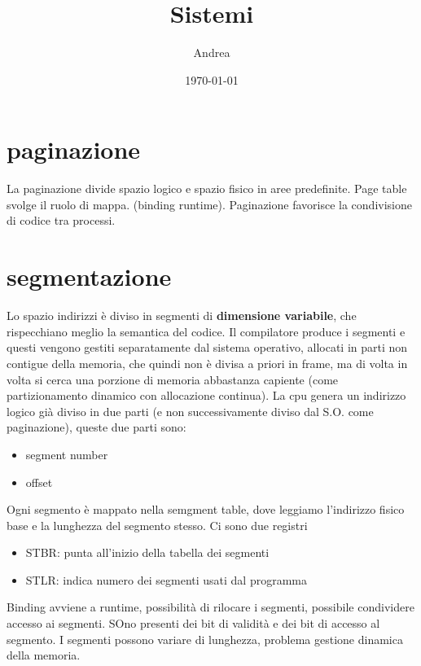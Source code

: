 \documentclass{article}
\title{Sistemi}
\author{Andrea}
\date{\today}
\begin{document}
\maketitle
\tableofcontents

\section{paginazione}
La paginazione divide spazio logico e spazio fisico in aree predefinite. Page table svolge il ruolo di mappa. (binding runtime).
Paginazione favorisce la condivisione di codice tra processi.

\section{segmentazione}
Lo spazio indirizzi è diviso in segmenti di \textbf{dimensione variabile}, che rispecchiano meglio la semantica del codice. Il 
compilatore produce i segmenti e questi vengono gestiti separatamente dal sistema operativo, allocati in parti non contigue della memoria, che quindi non è divisa a 
priori in frame, ma di volta in volta si cerca una porzione di memoria abbastanza capiente (come partizionamento dinamico con allocazione continua). La cpu genera
 un indirizzo logico già diviso in due parti (e non successivamente diviso dal S.O. come paginazione), queste due parti sono:
 \begin{itemize}
    \item segment number
    \item offset
 \end{itemize}
 Ogni segmento è mappato nella semgment table, dove leggiamo l'indirizzo fisico base e la lunghezza del segmento stesso.
 Ci sono due registri
 \begin{itemize}
    \item   STBR: punta all'inizio della tabella dei segmenti
    \item  STLR: indica numero dei segmenti usati dal programma
 \end{itemize}

 Binding avviene a runtime, possibilità di rilocare i segmenti, possibile condividere accesso ai segmenti. 
 SOno presenti dei bit di validità e dei bit di accesso al segmento. I segmenti possono variare di lunghezza, problema gestione dinamica della memoria.
\end{document}
